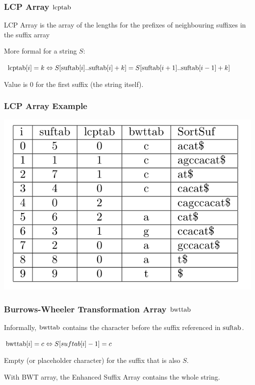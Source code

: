 \documentclass[compress,handout]{beamer} %
\begin{document}
\begin{frame}
	\frametitle{LCP Array $\hbox{lcptab}$}
	LCP Array is the array of the lengths for the prefixes of
	neighbouring suffixes in the suffix array

	More formal for a string $S$:

	$\hbox{lcptab}[i]=k \Leftrightarrow S[\hbox{suftab}[i]..\hbox{suftab}[i]+k]=S[\hbox{suftab}[i+1]..\hbox{suftab}[i-1]+k]$

	Value is $0$ for the first suffix (the string itself).
\end{frame}

\begin{frame}
	\frametitle{LCP Array Example}
	\includegraphics[width=\textwidth, height=\textheight, keepaspectratio=true]{esa_lcp_search}
\end{frame}

\begin{frame}
	\frametitle{Burrows-Wheeler Transformation Array $\hbox{bwttab}$}
	Informally, $\hbox{bwttab}$ contains the character before the
	suffix referenced in $\hbox{suftab}$.

	$\hbox{bwttab}[i]=c \Leftrightarrow S[suftab[i]-1]=c$

	Empty (or placeholder character) for the suffix that is also $S$.

	With BWT array, the Enhanced Suffix Array contains the whole
	string.
\end{frame}
\end{document}
